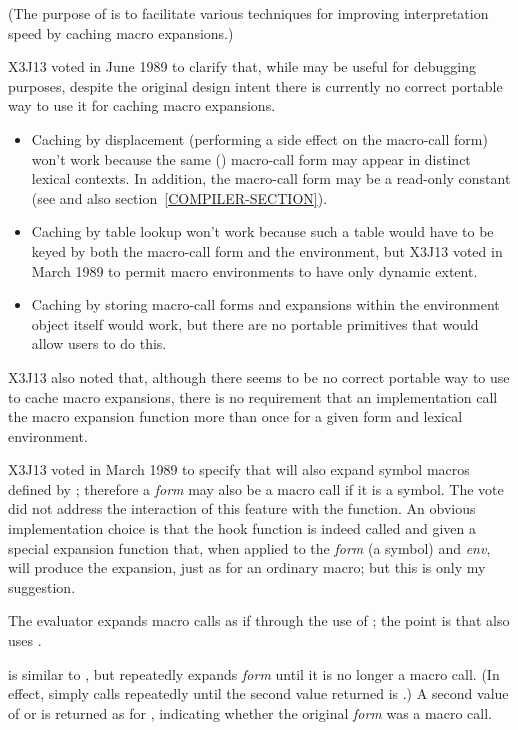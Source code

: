 \begin{defun}[Function]
\begin{obsolete}
(The purpose of
 is to facilitate various techniques
for improving interpretation speed by caching macro expansions.)
\end{obsolete}

\begin{newer}
X3J13 voted in June 1989  to clarify that, while
 may be useful for debugging purposes, despite
the original design intent there is
currently no correct portable way to use it for caching macro expansions.
\begin{itemize}
\item
 Caching by displacement (performing a side effect on the
 macro-call form) won't work because the same () macro-call
 form may appear in distinct lexical contexts.  In addition, the macro-call
 form may be a read-only constant (see  and also
 section~\ref{COMPILER-SECTION}).
\item
 Caching by table lookup won't work because such a table would have to
 be keyed by both the macro-call form and the environment,
 but X3J13 voted in March 1989 
 to permit macro environments to have only dynamic extent.
\item
 Caching by storing macro-call forms and expansions within the
 environment object itself would work, but there are no portable
 primitives that would allow users to do this.
\end{itemize}
X3J13 also noted that, although there seems to be no correct portable way to use
 to cache macro expansions, there is no
requirement that an implementation call the macro expansion
function more than once for a given form and lexical environment.
\end{newer}

\begin{new}
X3J13 voted in March 1989
to specify that  will also expand symbol macros
defined by ; therefore a \emph{form} may also be
a macro call if it is a symbol.  The vote did not address the interaction
of this feature with the  function.  An obvious
implementation choice is that the hook function is indeed called
and given a special expansion function that, when applied to the
\emph{form} (a symbol) and \emph{env}, will produce the expansion,
just as for an ordinary macro; but this is only my suggestion.
\end{new}

The evaluator expands macro calls as if through the use of ;
the point is that  also uses .

 is similar to ,
but repeatedly expands \emph{form} until it is no longer a macro call.
(In effect,  simply calls  repeatedly
until the second value returned is {\nil}.)
A second value of  or {\nil} is returned as for ,
indicating whether the original \emph{form} was a macro call.
\end{defun}


